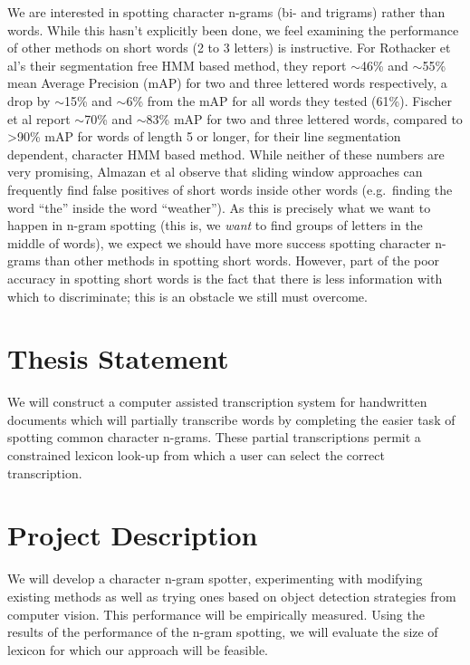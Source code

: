 \documentclass[ms]{byuprop}
\begin{document}
We are interested in spotting character n-grams (bi- and trigrams) rather than words. While this hasn't explicitly been done, we feel examining the performance of other methods on short words (2 to 3 letters) is instructive. For Rothacker et al's\cite{Rothacker2013} their segmentation free HMM based method, they report $\sim$46\% and $\sim$55\% mean Average Precision (mAP) for two and three lettered words respectively, a drop by $\sim$15\% and $\sim$6\% from the mAP for all words they tested (61\%). Fischer et al\cite{Fischer2012} report $\sim$70\% and $\sim$83\% mAP for two and three lettered words, compared to >90\% mAP for words of length 5 or longer, for their line segmentation dependent, character HMM based method. While neither of these numbers are very promising, Almazan et al\cite{Almazan2012} observe that sliding window approaches can frequently find false positives of short words inside other words (e.g.~finding the word ``the'' inside the word ``weather''). As this is precisely what we want to happen in n-gram spotting (this is, we \textit{want} to find groups of letters in the middle of words), we expect we should have more success spotting character n-grams than other methods in spotting short words. However, part of the poor accuracy in spotting short words is the fact that there is less information with which to discriminate; this is an obstacle we still must overcome.


\section{Thesis Statement}


We will construct a computer assisted transcription system for handwritten documents which will partially transcribe words by completing the easier task of spotting common character n-grams. These partial transcriptions permit a constrained lexicon look-up from which a user can select the correct transcription. 

\section{Project Description}

We will develop a character n-gram spotter, experimenting with modifying existing methods as well as trying ones based on object detection strategies from computer vision. This performance will be empirically measured. Using the results of the performance of the n-gram spotting, we will evaluate the size of lexicon for which our approach will be feasible.
\end{document}
